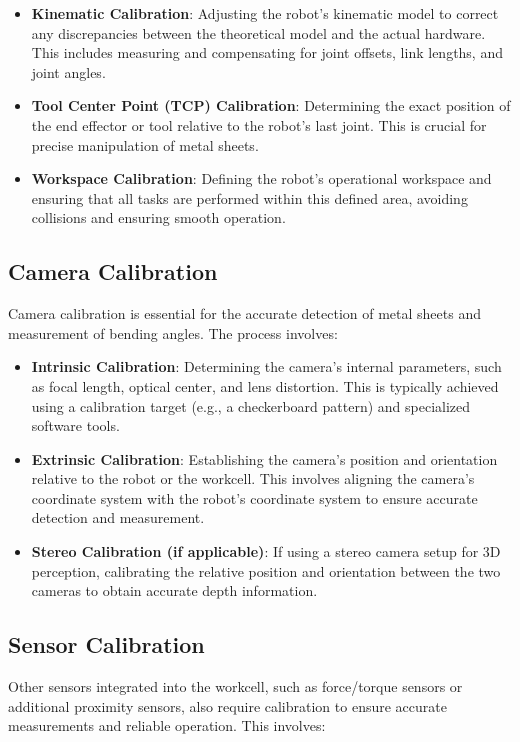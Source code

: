 \begin{itemize}
    \item \textbf{Kinematic Calibration}: Adjusting the robot’s kinematic model to correct any discrepancies between the theoretical model and the actual hardware. This includes measuring and compensating for joint offsets, link lengths, and joint angles.
    \item \textbf{Tool Center Point (TCP) Calibration}: Determining the exact position of the end effector or tool relative to the robot’s last joint. This is crucial for precise manipulation of metal sheets.
    \item \textbf{Workspace Calibration}: Defining the robot’s operational workspace and ensuring that all tasks are performed within this defined area, avoiding collisions and ensuring smooth operation.
\end{itemize}

\subsection{Camera Calibration}
Camera calibration is essential for the accurate detection of metal sheets and measurement of bending angles. The process involves:

\begin{itemize}
    \item \textbf{Intrinsic Calibration}: Determining the camera's internal parameters, such as focal length, optical center, and lens distortion. This is typically achieved using a calibration target (e.g., a checkerboard pattern) and specialized software tools.
    \item \textbf{Extrinsic Calibration}: Establishing the camera’s position and orientation relative to the robot or the workcell. This involves aligning the camera’s coordinate system with the robot’s coordinate system to ensure accurate detection and measurement.
    \item \textbf{Stereo Calibration (if applicable)}: If using a stereo camera setup for 3D perception, calibrating the relative position and orientation between the two cameras to obtain accurate depth information.
\end{itemize}

\subsection{Sensor Calibration}
Other sensors integrated into the workcell, such as force/torque sensors or additional proximity sensors, also require calibration to ensure accurate measurements and reliable operation. This involves:

